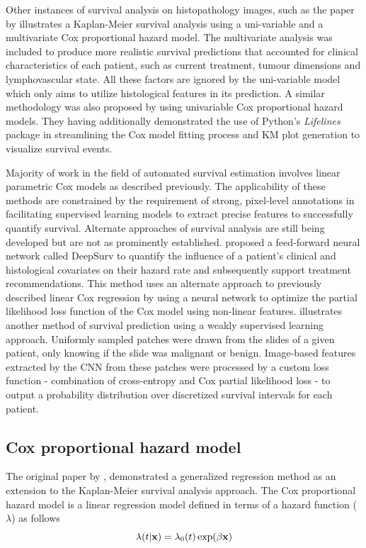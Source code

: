 \documentclass{l4proj}
\begin{document}
Other instances of survival analysis on histopathology images, such as the paper by \cite{Wetstein2022} illustrates a Kaplan-Meier survival analysis using a uni-variable and a multivariate Cox proportional hazard model. The multivariate analysis was included to produce more realistic survival predictions that accounted for clinical characteristics of each patient, such as current treatment, tumour dimensions and lymphovascular state. All these factors are ignored by the uni-variable model which only aims to utilize histological features in its prediction. A similar methodology was also proposed by \cite{Liu2022} using univariable Cox proportional hazard models. They having additionally demonstrated the use of Python's \textit{Lifelines} package in streamlining the Cox model fitting process and KM plot generation to visualize survival events. 

Majority of work in the field of automated survival estimation involves linear parametric Cox models as described previously. The applicability 
of these methods are constrained by the requirement of strong, pixel-level annotations in facilitating supervised learning models to extract precise features to successfully quantify survival. Alternate approaches of survival analysis are still being developed but are not as prominently established.  \cite{katzman2018deepsurv} proposed a feed-forward neural network called DeepSurv to quantify the influence of a patient's clinical and histological covariates on their hazard rate and subsequently support treatment recommendations. This method uses an alternate approach to  previously described linear Cox regression by using a neural network to optimize the partial likelihood loss function of the Cox model using non-linear features. \cite{wulczyn2020deep} illustrates another method of survival prediction using a weakly supervised learning approach. Uniformly sampled patches were drawn from the slides of a given patient, only knowing if the slide was malignant or benign. Image-based features extracted by the CNN from these patches were processed by a custom loss function - combination of cross-entropy and Cox partial likelihood loss - to output a probability distribution over discretized survival intervals for each patient.

\subsection{Cox proportional hazard model} \label{cph-background}
The original paper by \cite{cox1972regression}, demonstrated a generalized regression method as an extension to the Kaplan-Meier survival analysis approach. The Cox proportional hazard model is a linear regression model defined in terms of a hazard function (\(\lambda\)) as follows
\begin{equation}
    \centering
    \lambda (t | \textbf{x}) = \lambda_0 (t) \exp (\beta \textbf{x})
    \label{eq:hazard model}
\end{equation}
\end{document}
